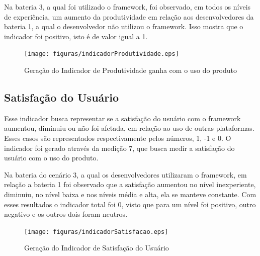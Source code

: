 Na bateria 3, a qual foi utilizado o framework, foi observado, em todos os níveis de experiência, um aumento da
produtividade em relação aos desenvolvedores da bateria 1, a qual o desenvolvedor não utilizou o framework. Isso
mostra que o indicador foi positivo, isto é de valor igual a 1.

\begin{figure}[H]
  \centering
  \label{fig:indicador1}
  \texttt{[image: figuras/indicadorProdutividade.eps]}
  \caption{Geração do Indicador de Produtividade ganha com o uso do produto}
\end{figure}

\subsection{Satisfação do Usuário}

Esse indicador busca representar se a satisfação do usuário com o framework aumentou, diminuiu ou não foi afetada,
em relação ao uso de outras plataformas. Esses casos são representados respectivamente pelos números, 1, -1 e 0.
O indicador foi gerado através da medição 7, que busca medir a satisfação do usuário com o uso do produto.

Na bateria do cenário 3, a qual os desenvolvedores utilizaram o framework, em relação a bateria 1 foi observado que
a satisfação aumentou no nível inexperiente, diminuiu, no nível baixa e nos níveis média e alta, ela se manteve constante.
Com esses resultados o indicador total foi 0, visto que para um nível foi positivo, outro negativo e os outros dois
foram neutros.

\begin{figure}[H]
  \centering
  \label{fig:indicador1}
  \texttt{[image: figuras/indicadorSatisfacao.eps]}
  \caption{Geração do Indicador de Satisfação do Usuário}
\end{figure}

